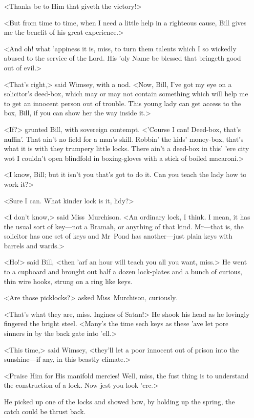 <Thanks be to Him that giveth the victory!>

<But from time to time, when I need a little help in a righteous cause, Bill gives me the benefit of his great experience.>

<And oh! what 'appiness it is, miss, to turn them talents which I so wickedly abused to the service of the Lord. His 'oly Name be blessed that bringeth good out of evil.>

<That's right,> said Wimsey, with a nod. <Now, Bill, I've got my eye on a solicitor's deed-box, which may or may not contain something which will help me to get an innocent person out of trouble. This young lady can get access to the box, Bill, if you can show her the way inside it.>

<If?> grunted Bill, with sovereign contempt. <'Course I can! Deed-box, that's nuffin'. That ain't no field for a man's skill. Robbin' the kids' money-box, that's what it is with they trumpery little locks. There ain't a deed-box in this' 'ere city wot I couldn't open blindfold in boxing-gloves with a stick of boiled macaroni.>

<I know, Bill; but it isn't you that's got to do it. Can you teach the lady how to work it?>

<Sure I can. What kinder lock is it, lidy?>

<I don't know,> said Miss~Murchison. <An ordinary lock, I think. I mean, it has the usual sort of key—not a Bramah, or anything of that kind. Mr—that is, the solicitor has one set of keys and Mr~Pond has another—just plain keys with barrels and wards.>

<Ho!> said Bill, <then 'arf an hour will teach you all you want, miss.> He went to a cupboard and brought out half a dozen lock-plates and a bunch of curious, thin wire hooks, strung on a ring like keys.

<Are those picklocks?> asked Miss~Murchison, curiously.

<That's what they are, miss. Ingines of Satan!> He shook his head as he lovingly fingered the bright steel. <Many's the time sech keys as these 'ave let pore sinners in by the back gate into 'ell.>

<This time,> said Wimsey, <they'll let a poor innocent out of prison into the sunshine—if any, in this beastly climate.>

<Praise Him for His manifold mercies! Well, miss, the fust thing is to understand the construction of a lock. Now jest you look 'ere.>

He picked up one of the locks and showed how, by holding up the spring, the catch could be thrust back.

